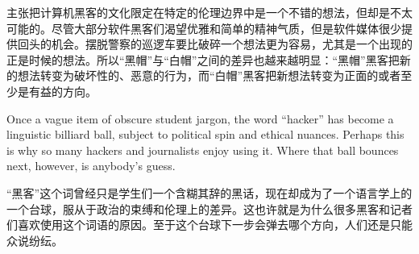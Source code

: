\ifdefined\chs
主张把计算机黑客的文化限定在特定的伦理边界中是一个不错的想法，但却是不太可能的。尽管大部分软件黑客们渴望优雅和简单的精神气质，但是软件媒体很少提供回头的机会。摆脱警察的巡逻车要比破碎一个想法更为容易，尤其是一个出现的正是时候的想法。所以“黑帽”与“白帽”之间的差异也越来越明显：“黑帽”黑客把新的想法转变为破坏性的、恶意的行为，而“白帽”黑客把新想法转变为正面的或者至少是有益的方向。
\fi

\ifdefined\eng
Once a vague item of obscure student jargon, the word ``hacker'' has become a linguistic billiard ball, subject to political spin and ethical nuances. Perhaps this is why so many hackers and journalists enjoy using it. Where that ball bounces next, however, is anybody's guess. %
\fi

\ifdefined\chs
“黑客”这个词曾经只是学生们一个含糊其辞的黑话，现在却成为了一个语言学上的一个台球，服从于政治的束缚和伦理上的差异。这也许就是为什么很多黑客和记者们喜欢使用这个词语的原因。至于这个台球下一步会弹去哪个方向，人们还是只能众说纷纭。%
\fi
